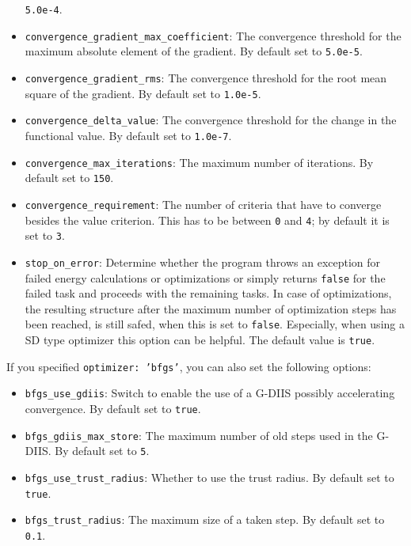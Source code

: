 \documentclass[]{tufte-book}
\begin{document}
\begin{itemize}
\texttt{5.0e-4}.
\item \texttt{convergence\_gradient\_max\_coefficient}: The convergence threshold for the maximum absolute element of the gradient.
By default set to \texttt{5.0e-5}.
\item \texttt{convergence\_gradient\_rms}: The convergence threshold for the root mean square of the gradient. By default set to
\texttt{1.0e-5}.
\item \texttt{convergence\_delta\_value}: The convergence threshold for the change in the functional value. By default set to
\texttt{1.0e-7}.
\item \texttt{convergence\_max\_iterations}: The maximum number of iterations. By default set to \texttt{150}.
\item \texttt{convergence\_requirement}: The number of criteria that have to converge besides the value criterion. This
has to be between \texttt{0} and \texttt{4}; by default it is set to \texttt{3}.
\item \texttt{stop\_on\_error}: Determine whether the program throws an exception for failed energy calculations or optimizations or simply returns \texttt{false} for the failed task and proceeds with the remaining tasks. In case of optimizations, the resulting structure after the maximum number of optimization steps has been reached, is still safed, when this is set to \texttt{false}. Especially, when using a SD type optimizer this option can be helpful. The default value is \texttt{true}.
\end{itemize}

If you specified \texttt{optimizer: 'bfgs'}, you can also set the following options:
\begin{itemize}
\item \texttt{bfgs\_use\_gdiis}: Switch to enable the use of a G-DIIS possibly accelerating convergence. By default set to
\texttt{true}.
\item \texttt{bfgs\_gdiis\_max\_store}: The maximum number of old steps used in the G-DIIS. By default set to \texttt{5}.
\item \texttt{bfgs\_use\_trust\_radius}: Whether to use the trust radius. By default set to \texttt{true}.
\item \texttt{bfgs\_trust\_radius}: The maximum size of a taken step. By default set to \texttt{0.1}.
\end{itemize}
\end{document}
